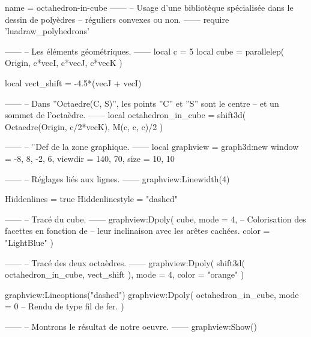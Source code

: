 \documentclass{standalone}
\begin{document}
\begin{luadraw}{name = octahedron-in-cube}
------
-- Usage d'une bibliotèque spécialisée dans le dessin de polyèdres
-- réguliers convexes ou non.
------
require 'luadraw_polyhedrons'

------
-- Les éléments géométriques.
------
local c = 5
local cube = parallelep(
  Origin,
  c*vecI, c*vecJ, c*vecK
)

local vect_shift = -4.5*(vecJ + vecI)

------
-- Dans ''Octaedre(C, S)'', les points ''C'' et ''S'' sont le centre
-- et un sommet de l'octaèdre.
------
local octahedron_in_cube = shift3d(
  Octaedre(Origin, c/2*vecK),
  M(c, c, c)/2
)

------
-- ¨Def de la zone graphique.
------
local graphview = graph3d:new{
  window  = {-8, 8, -2, 6},
  viewdir = {140, 70},
  size    = {10, 10}
}

------
-- Réglages liés aux lignes.
------
graphview:Linewidth(4)

Hiddenlines     = true
Hiddenlinestyle = "dashed"

------
-- Tracé du cube.
------
graphview:Dpoly(
  cube,
  {
    mode  = 4,  -- Colorisation des facettes en fonction de
                -- leur inclinaison avec les arêtes cachées.
    color = "LightBlue"
  }
)

------
-- Tracé des deux octaèdres.
------
graphview:Dpoly(
  shift3d(
    octahedron_in_cube,
    vect_shift
  ),
  {
    mode = 4,
    color = "orange"
  }
)

graphview:Lineoptions("dashed")
graphview:Dpoly(
  octahedron_in_cube,
  {
    mode = 0  -- Rendu de type fil de fer.
  }
)

------
-- Montrons le résultat de notre oeuvre.
------
graphview:Show()
\end{luadraw}
\end{document}
